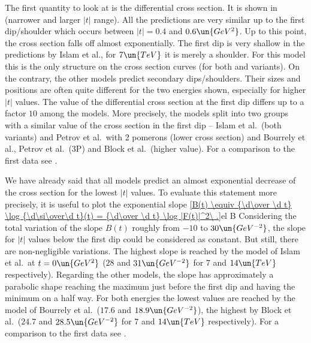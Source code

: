 The first quantity to look at is the differential cross section. It is shown in  (narrower and larger $|t|$ range). All the predictions are very similar up to the first dip/shoulder which occurs between $|t| = 0.4$ and $0.6\un{GeV^2}$. Up to this point, the cross section falls off almost exponentially. The first dip is very shallow in the predictions by Islam et al., for $7\un{TeV}$ it is merely a shoulder. For this model this is the only structure on the cross section curves (for both  and  variants). On the contrary, the other models predict secondary dips/shoulders. Their sizes and positions are often quite different for the two energies shown, especially for higher $|t|$ values. The value of the differential cross section at the first dip differs up to a factor $10$ among the models. More precisely, the models split into two groups with a similar value of the cross section in the first dip -- Islam et al.\ (both variants) and Petrov et al.\ with 2 pomerons (lower cross section) and Bourrely et al., Petrov et al.\ (3P) and Block et al.\ (higher value). For a comparison to the first  data see .



We have already said that all models predict an almost exponential decrease of the cross section for the lowest $|t|$ values. To evaluate this statement more precisely, it is useful to plot the exponential slope
\eqref{B(t) \equiv {\d\over \d t} \log {\d\si\over\d t}(t) = {\d\over \d t} \log |F(t)|^2\ .}{el B}
Considering the total variation of the slope $B(t)$ roughly from $-10$ to $30\un{GeV^{-2}}$, the slope for $|t|$ values below the first dip could be considered as constant. But still, there are non-negligible variations. The highest slope is reached by the model of Islam et al.\ at $t=0\un{GeV^2}$ ($28$ and $31\un{GeV^{-2}}$ for $7$ and $14\un{TeV}$ respectively). Regarding the other models, the slope has approximately a parabolic shape reaching the maximum just before the first dip and having the minimum on a half way. For both energies the lowest values are reached by the model of Bourrely et al.\ ($17.6$ and $18.9\un{GeV^{-2}}$), the highest by Block et al.\ ($24.7$ and $28.5\un{GeV^{-2}}$ for $7$ and $14\un{TeV}$ respectively). For a comparison to the first  data see .

